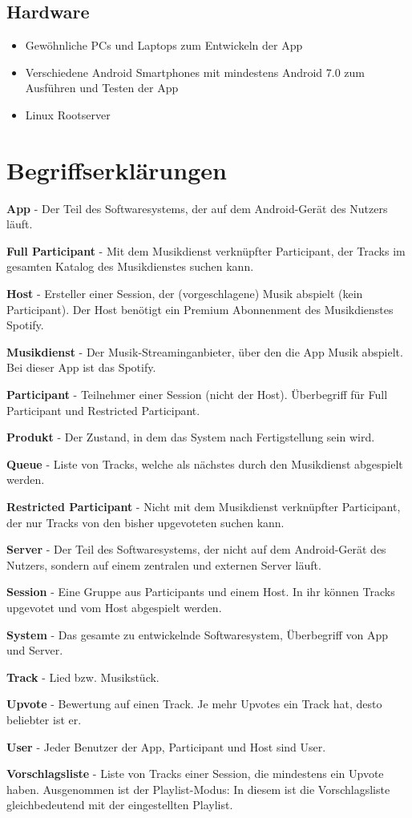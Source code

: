 \documentclass[oneside, ngerman]{sdqtechreport}
\begin{document}
\section{Hardware}
\label{sec:Entwicklungsumgebung:Hardware}

\begin{itemize}
    \item Gewöhnliche PCs und Laptops zum Entwickeln der App
    \item Verschiedene Android Smartphones mit mindestens Android 7.0 zum Ausführen und Testen der App
    \item Linux Rootserver
\end{itemize}



\chapter{Begriffserklärungen}
\label{chap:Begriffserklärungen}

\textbf{App}
 - Der Teil des Softwaresystems, der auf dem Android-Gerät des Nutzers läuft.

 \textbf{Full Participant}
 - Mit dem Musikdienst verknüpfter Participant, der Tracks im gesamten Katalog des Musikdienstes suchen kann.

\textbf{Host}
 - Ersteller einer Session, der (vorgeschlagene) Musik abspielt (kein Participant). Der Host benötigt ein Premium Abonnenment des Musikdienstes Spotify.

 \textbf{Musikdienst}
 - Der Musik-Streaminganbieter, über den die App Musik abspielt. Bei dieser App ist das Spotify.

 \textbf{Participant}
 - Teilnehmer einer Session (nicht der Host). Überbegriff für Full Participant und Restricted Participant.

 \textbf{Produkt}
 - Der Zustand, in dem das System nach Fertigstellung sein wird.

 \textbf{Queue}
 - Liste von Tracks, welche als nächstes durch den Musikdienst abgespielt werden.

 \textbf{Restricted Participant}
 - Nicht mit dem Musikdienst verknüpfter Participant, der nur Tracks von den bisher upgevoteten suchen kann.

 \textbf{Server}
 - Der Teil des Softwaresystems, der nicht auf dem Android-Gerät des Nutzers, sondern auf einem zentralen und externen Server läuft.

 \textbf{Session}
 - Eine Gruppe aus Participants und einem Host. In ihr können Tracks upgevotet und vom Host abgespielt werden.

\textbf{System}
 - Das gesamte zu entwickelnde Softwaresystem, Überbegriff von App und Server.

 \textbf{Track}
 - Lied bzw. Musikstück.

 \textbf{Upvote}
 - Bewertung auf einen Track. Je mehr Upvotes ein Track hat, desto beliebter ist er.

 \textbf{User}
 - Jeder Benutzer der App, Participant und Host sind User.

 \textbf{Vorschlagsliste}
 - Liste von Tracks einer Session, die mindestens ein Upvote haben. Ausgenommen ist der Playlist-Modus: In diesem ist die Vorschlagsliste gleichbedeutend mit der eingestellten Playlist.
 
\end{document}
